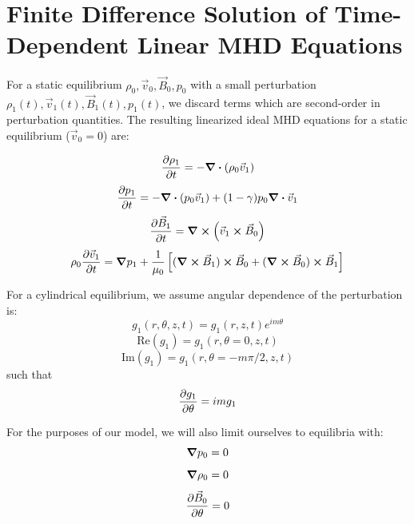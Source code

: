 \documentclass[%
 reprint,
 amsmath,amssymb,
 aps,
]{revtex4-2}
\begin{document}
\nocite{*}



\onecolumngrid

\pagebreak

\appendix

\section{Finite Difference Solution of Time-Dependent Linear MHD Equations}

For a static equilibrium $\rho_0, \vec v _0, \vec B_0, p_0$ with a small perturbation $\rho_1(t), \vec v_1(t), \vec B_1(t), p_1(t)$, we discard terms which are second-order in perturbation quantities. The resulting linearized ideal MHD equations for a static equilibrium ($\vec v_0 = 0$) are:

\begin{equation}
\pdv{\rho_1}{t} = - \div ( \rho_0 \vec v_1)    
\end{equation}
\begin{equation}
\pdv{p_1}{t} = - \div (p_0 \vec v _1) + (1 - \gamma) p_0 \div \vec v_1 
\end{equation}
\begin{equation}
\pdv{\vec B_1}{t} = \curl ( \vec v_1 \cross \vec B_0)
\end{equation}
\begin{equation}
\rho_0 \pdv{\vec v_1}{t} = \grad p_1 + \frac{1}{\mu_0} \left[ (\curl \vec B_1) \cross \vec B_0 + (\curl \vec B_0) \cross \vec B_1 \right]
\end{equation}

For a cylindrical equilibrium, we assume angular dependence of the perturbation is:
\begin{equation}
g_1 (r, \theta, z, t) = g_1(r, z, t) e^{i m \theta}
\end{equation}
\begin{equation}
\text{Re}(g_1) = g_1(r, \theta=0, z, t)
\end{equation}
\begin{equation}
\text{Im}(g_1) = g_1(r, \theta=- m \pi/2, z, t)
\end{equation}
such that
\begin{equation}
\pdv{g_1}{\theta} = i m g_1
\end{equation}

For the purposes of our model, we will also limit ourselves to equilibria with:
\begin{equation}
\grad p_0 = 0
\end{equation}
\begin{equation}
\grad \rho_0 = 0
\end{equation}
\begin{equation}
\pdv{\vec B_0}{\theta} = 0
\end{equation}
\end{document}
